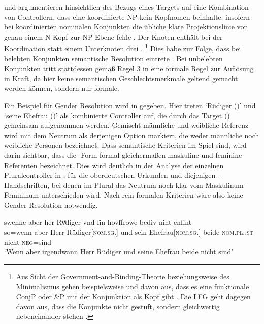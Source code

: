 \citet[182--183]{wechslerzlatic2003} und \citet[576]{wechsler2009}
argumentieren hinsichtlich des Bezugs eines Targets auf eine Kombination von
Controllern, dass eine koordinierte NP kein Kopf\-nomen beinhalte, insofern bei
koordinierten nominalen Konjunkten die übliche klare Projektionslinie von genau
einem N-Kopf zur NP-Ebene fehle \autocites[183,
Anm.~85]{wechslerzlatic2003}[585, Anm.~7]{wechsler2009}. Der Knoten 
enthält bei der Koordination statt einem Unterknoten drei .%
%
	\footnote{Aus Sicht der Government-and-Binding-Theorie beziehungsweise des
	Minimalismus gehen beispielsweise
	\textcites{johannessen1998}{johannessen2005} und \citet{shen2019} davon
	aus, dass es eine funktionale ConjP oder \&P mit der Konjunktion als Kopf
	gibt \autocite[dagegen aber][]{borsley2005}. Die LFG geht dagegen davon
	aus, dass die Konjunkte nicht gestuft, sondern gleichwertig nebeneinander
	stehen \autocites[vgl.~z.\,B.][]{peterson2004}{sadlernordlinger2006}.}
%
Dies habe zur Folge, dass bei belebten Konjunkten semantische Resolution
eintrete \autocites[183]{wechslerzlatic2003}[576]{wechsler2009}. Bei unbelebten
Konjunkten tritt stattdessen gemäß Regel 3 in  eine
formale Regel zur Auflösung in Kraft, da hier keine semantischen
Geschlechtsmerkmale geltend gemacht werden können, sondern nur formale.

Ein Beispiel für Gender Resolution wird in  gegeben. Hier
treten  `Rüdiger (\MascM)' und  `seine Ehefrau
(\FemF)' als kombinierte Controller auf, die durch das Target 
(\NeutMF) gemeinsam aufgenommen werden. Gemischt männliche und weibliche
Referenz wird mit dem Neutrum als derjenigen Option markiert, die weder
männliche noch weibliche Personen bezeichnet. Dass semantische Kriterien im
Spiel sind, wird darin sichtbar, dass die -Form formal gleichermaßen
maskuline und feminine Referenten bezeichnet. Dies wird deutlich in der Analyse
der einzelnen Pluralcontroller in ,  für die
oberdeutschen Urkunden und diejenigen \KC{}-Handschriften, bei denen im Plural
das Neutrum noch klar vom Maskulinum-Femininum unterschieden wird. Nach rein
formalen Kriterien wäre also keine Gender Resolution notwendig.

\begin{exe}
\ex \label{ex:gendres2}
		\gll swenne aber her Rvͦdiger vnd ſin
			hovſfrowe bediv niht enſint \\
		so=wenn aber Herr Rüdiger[\textsc{nom.sg.\MascM}] und sein
			Ehefrau[\textsc{nom.sg.\FemF}] beide-\textsc{nom.pl.\NeutMF.st}
			nicht \textsc{neg}=sind \\
		\trans `Wenn aber irgendwann Herr Rüdiger und seine Ehefrau
			beide nicht  sind'
			\parencites(Nr.~3262, Regensburg, 1299)[425,13--14]{cao4}
\end{exe}

